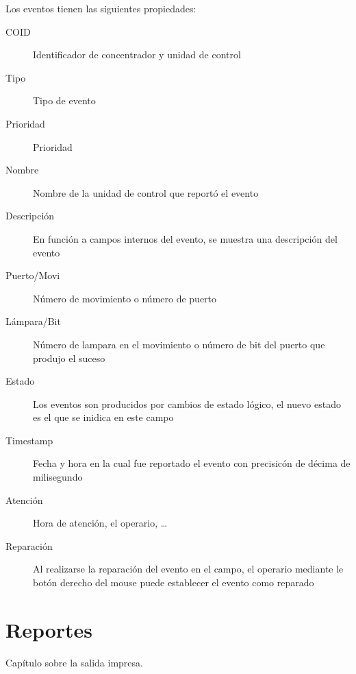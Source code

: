 \documentclass[11pt,a4paper]{report}
\begin{document}
Los eventos tienen las siguientes propiedades:
\begin{description}
  \item [COID] { Identificador de concentrador y unidad de control }
  \item [Tipo] { Tipo de evento }
  \item [Prioridad] { Prioridad }
  \item [Nombre] { Nombre de la unidad de control que reportó el evento}
  \item [Descripción] { En función a campos internos del evento, se muestra una
  descripción del evento }
  \item [Puerto/Movi] { Número de movimiento o número de puerto }
  \item [Lámpara/Bit] { Número de lampara en el movimiento o número de bit del
  puerto que produjo el suceso }
  \item [Estado] { Los eventos son producidos por cambios de estado lógico, el
  nuevo estado es el que se inidica en este campo }
  \item [Timestamp] { Fecha y hora en la cual fue reportado el evento con
  precisicón de  décima de milisegundo }
  \item [Atención] { Hora de atención, el operario, \ldots}
  \item [Reparación] { Al realizarse la reparación del evento en el campo, el
  operario mediante le botón derecho del mouse puede establecer el evento como
  reparado }
  
\end{description}


\chapter{Reportes}
\label{ch:print}
Capítulo sobre la salida impresa.
\end{document}
